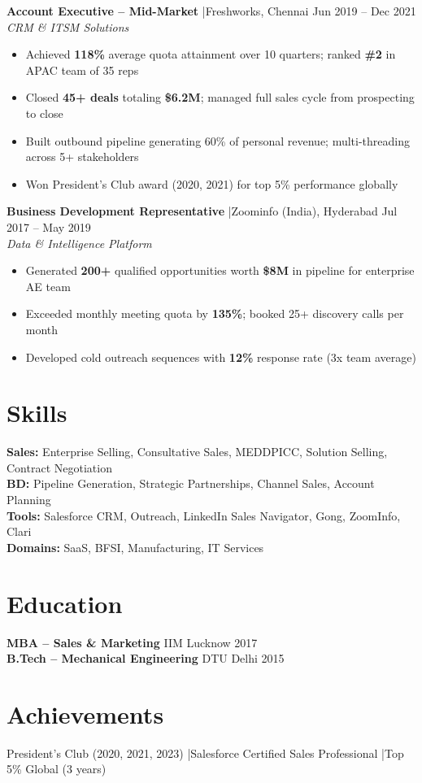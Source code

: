 \documentclass[10pt,a4paper]{article}
\newcommand{\num}[1]{{\bfseries\color{accent}#1}}
\begin{document}
\textbf{Account Executive -- Mid-Market} \quad|\quad Freshworks, Chennai \hfill Jun 2019 -- Dec 2021\\
{\small\itshape CRM \& ITSM Solutions}
\begin{itemize}
  \item Achieved \num{118\%} average quota attainment over 10 quarters; ranked \num{\#2} in APAC team of 35 reps
  \item Closed \num{45+ deals} totaling \num{\$6.2M}; managed full sales cycle from prospecting to close
  \item Built outbound pipeline generating 60\% of personal revenue; multi-threading across 5+ stakeholders
  \item Won President's Club award (2020, 2021) for top 5\% performance globally
\end{itemize}

\textbf{Business Development Representative} \quad|\quad Zoominfo (India), Hyderabad \hfill Jul 2017 -- May 2019\\
{\small\itshape Data \& Intelligence Platform}
\begin{itemize}
  \item Generated \num{200+} qualified opportunities worth \num{\$8M} in pipeline for enterprise AE team
  \item Exceeded monthly meeting quota by \num{135\%}; booked 25+ discovery calls per month
  \item Developed cold outreach sequences with \num{12\%} response rate (3x team average)
\end{itemize}

\section{Skills}
\textbf{Sales:} Enterprise Selling, Consultative Sales, MEDDPICC, Solution Selling, Contract Negotiation\\
\textbf{BD:} Pipeline Generation, Strategic Partnerships, Channel Sales, Account Planning\\
\textbf{Tools:} Salesforce CRM, Outreach, LinkedIn Sales Navigator, Gong, ZoomInfo, Clari\\
\textbf{Domains:} SaaS, BFSI, Manufacturing, IT Services

\section{Education}
\textbf{MBA -- Sales \& Marketing} \hfill IIM Lucknow \hfill 2017\\
\textbf{B.Tech -- Mechanical Engineering} \hfill DTU Delhi \hfill 2015

\section{Achievements}
President's Club (2020, 2021, 2023) \quad|\quad Salesforce Certified Sales Professional \quad|\quad Top 5\% Global (3 years)
\end{document}
